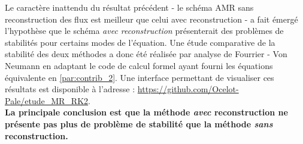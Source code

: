 \label{par:stab_amr}
Le caractère inattendu du résultat précédent - le schéma AMR sans reconstruction des flux est meilleur que celui avec reconstruction - a fait émergé l'hypothèse 
que le schéma \textit{avec reconstruction} présenterait des problèmes de stabilités pour certains modes de l'équation.
Une étude comparative de la stabilité des deux méthodes a donc été réalisée par analyse de Fourrier - Von Neumann en adaptant le code de calcul formel ayant fourni les équations équivalente en \ref{par:contrib_2}.
Une interface permettant de visualiser ces résultats est disponible à l'adresse : \href{https://github.com/Ocelot-Pale/etude\_MR\_RK2}{https://github.com/Ocelot-Pale/etude\_MR\_RK2}.\\
\textbf{La principale conclusion est que la méthode \textit{avec} reconstruction ne présente pas plus de problème de stabilité que la méthode \textit{sans} reconstruction.}


